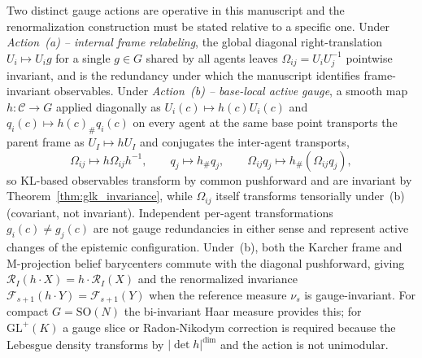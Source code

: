 \documentclass[11pt]{article}
\begin{document}
Two distinct gauge actions are operative in this manuscript and the renormalization construction must be stated relative to a specific one. Under \emph{Action~(a) -- internal frame relabeling}, the global diagonal right-translation $U_i \mapsto U_i g$ for a single $g \in G$ shared by all agents leaves $\Omega_{ij} = U_i U_j^{-1}$ pointwise invariant, and is the redundancy under which the manuscript identifies frame-invariant observables. Under \emph{Action~(b) -- base-local active gauge}, a smooth map $h : \mathcal{C} \to G$ applied diagonally as $U_i(c) \mapsto h(c) U_i(c)$ and $q_i(c) \mapsto h(c)_\# q_i(c)$ on every agent at the same base point transports the parent frame as $U_I \mapsto h U_I$ and conjugates the inter-agent transports,
\begin{equation}
\Omega_{ij} \mapsto h \Omega_{ij} h^{-1}, \qquad q_j \mapsto h_\# q_j, \qquad \Omega_{ij} q_j \mapsto h_\#(\Omega_{ij} q_j),
\end{equation}
so KL-based observables transform by common pushforward and are invariant by Theorem~\ref{thm:glk_invariance}, while $\Omega_{ij}$ itself transforms tensorially under~(b) (covariant, not invariant). Independent per-agent transformations $g_i(c) \neq g_j(c)$ are not gauge redundancies in either sense and represent active changes of the epistemic configuration. Under~(b), both the Karcher frame and M-projection belief barycenters commute with the diagonal pushforward, giving $\mathcal{R}_I(h \cdot X) = h \cdot \mathcal{R}_I(X)$ and the renormalized invariance $\mathcal{F}_{s+1}(h \cdot Y) = \mathcal{F}_{s+1}(Y)$ when the reference measure $\nu_s$ is gauge-invariant. For compact $G = \mathrm{SO}(N)$ the bi-invariant Haar measure provides this; for $\mathrm{GL}^+(K)$ a gauge slice or Radon-Nikodym correction is required because the Lebesgue density transforms by $|\det h|^{\dim}$ and the action is not unimodular.
\end{document}
